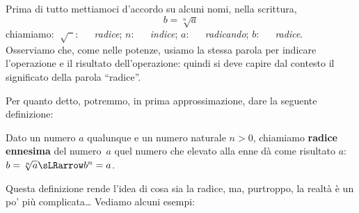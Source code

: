 Prima di tutto mettiamoci d'accordo su alcuni nomi, nella scrittura,
{\large
\[b=\sqrt[n]{a}\]
}
{\normalsize
chiamiamo:}
{\large 
\(\sqrt[]{\phantom{a}}\): ~~ \emph{radice}; \quad
\(n\): ~~ \emph{indice}; \quad
\(a\): ~~ \emph{radicando}; \quad
\(b\): ~~ \emph{radice}.
}\\[.5em]
\normalsize
Osserviamo che, come nelle potenze, usiamo la stessa parola per indicare
l'operazione e il risultato dell'operazione: quindi si deve capire dal
contesto il significato della parola ``radice''.

Per quanto detto, potremmo, in prima approssimazione,  dare la seguente 
definizione: 

\begin{definizione}{}{}
Dato un numero \(a\) qualunque e un numero naturale \(n > 0\),
chiamiamo \textbf{radice ennesima} del numero~\(a\) quel numero che 
elevato alla enne dà come risultato \(a\): \quad 
\(b=\sqrt[n]{a} \sLRarrow b^n=a\).
\end{definizione}

Questa definizione rende l'idea di cosa sia la radice, ma, purtroppo, la 
realtà è un po' più complicata\dots 
Vediamo alcuni esempi:

